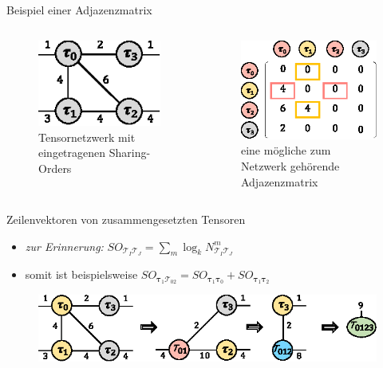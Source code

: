 \documentclass{beamer}
\newcommand{\Tau}{\bm{\mathcal{T}}}
\newcommand{\tauB}{\bm{\tau}}
\begin{document}
\begin{frame}{Beispiel einer Adjazenzmatrix}
	\begin{columns}
		\begin{figure}
			\includegraphics[scale=1.7]{figure_03_a_mid}
			\caption*{Tensornetzwerk mit eingetragenen Sharing-Orders}
		\end{figure}
		\begin{figure}
			\includegraphics[scale=1.3]{figure_05_c}
			\caption*{eine mögliche zum Netzwerk gehörende Adjazenzmatrix}
		\end{figure}
	\end{columns}
\end{frame}

\begin{frame}{Zeilenvektoren von zusammengesetzten Tensoren}
	\begin{itemize}
		\item \textit{zur Erinnerung:} $SO_{\Tau_I \Tau_J} = \sum_m \log_k N^m_{\Tau_I \Tau_J}$
		\item somit ist beispielsweise $SO_{\tauB_1 \Tau_{02}} = SO_{\tauB_1 \tauB_0} + SO_{\tauB_1 \tauB_2}$
	\end{itemize} \pause

	\begin{figure}
		\includegraphics{figure_03_b_low}
	\end{figure}
\end{frame}
\end{document}
